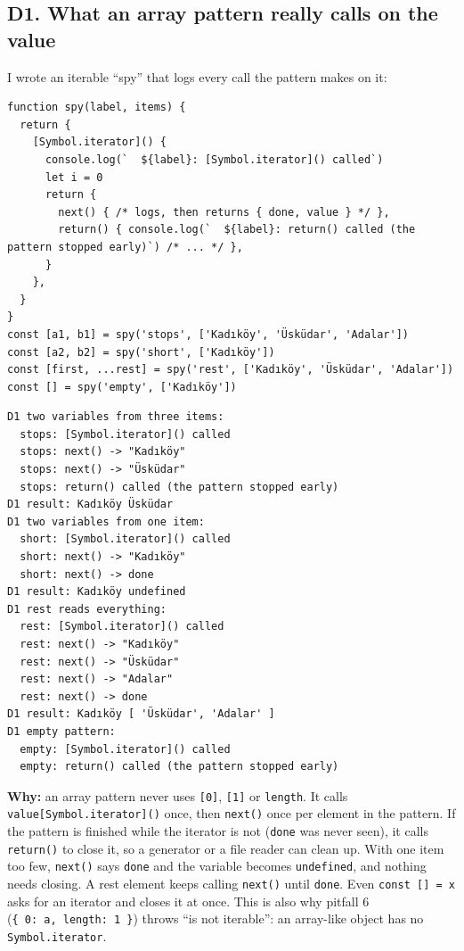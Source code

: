 \documentclass[
  10pt,
]{article}
\begin{document}
\hypertarget{d1-what-an-array-pattern-really-calls-on-the-value}{%
\subsection{D1. What an array pattern really calls on the
value}\label{d1-what-an-array-pattern-really-calls-on-the-value}}

I wrote an iterable ``spy'' that logs every call the pattern makes on
it:

\begin{verbatim}
function spy(label, items) {
  return {
    [Symbol.iterator]() {
      console.log(`  ${label}: [Symbol.iterator]() called`)
      let i = 0
      return {
        next() { /* logs, then returns { done, value } */ },
        return() { console.log(`  ${label}: return() called (the pattern stopped early)`) /* ... */ },
      }
    },
  }
}
const [a1, b1] = spy('stops', ['Kadıköy', 'Üsküdar', 'Adalar'])
const [a2, b2] = spy('short', ['Kadıköy'])
const [first, ...rest] = spy('rest', ['Kadıköy', 'Üsküdar', 'Adalar'])
const [] = spy('empty', ['Kadıköy'])
\end{verbatim}

\begin{verbatim}
D1 two variables from three items:
  stops: [Symbol.iterator]() called
  stops: next() -> "Kadıköy"
  stops: next() -> "Üsküdar"
  stops: return() called (the pattern stopped early)
D1 result: Kadıköy Üsküdar
D1 two variables from one item:
  short: [Symbol.iterator]() called
  short: next() -> "Kadıköy"
  short: next() -> done
D1 result: Kadıköy undefined
D1 rest reads everything:
  rest: [Symbol.iterator]() called
  rest: next() -> "Kadıköy"
  rest: next() -> "Üsküdar"
  rest: next() -> "Adalar"
  rest: next() -> done
D1 result: Kadıköy [ 'Üsküdar', 'Adalar' ]
D1 empty pattern:
  empty: [Symbol.iterator]() called
  empty: return() called (the pattern stopped early)
\end{verbatim}

\textbf{Why:} an array pattern never uses \texttt{{[}0{]\allowbreak{}}},
\texttt{{[}1{]\allowbreak{}}} or \texttt{length}. It calls
\texttt{value{[}Symbol.\allowbreak{}iterator{]\allowbreak{}}()} once,
then \texttt{next()} once per element in the pattern. If the pattern is
finished while the iterator is not (\texttt{done} was never seen), it
calls \texttt{return()} to close it, so a generator or a file reader can
clean up. With one item too few, \texttt{next()} says \texttt{done} and
the variable becomes \texttt{undefined}, and nothing needs closing. A
rest element keeps calling \texttt{next()} until \texttt{done}. Even
\texttt{const\ {[}{]\allowbreak{}}\ =\ x} asks for an iterator and
closes it at once. This is also why pitfall 6
(\texttt{\{\ 0:\ \allowbreak{}\textquotesingle{}a\allowbreak{}\textquotesingle{},\ length:\ 1\ \}})
throws ``is not iterable'': an array-like object has no
\texttt{Symbol.\allowbreak{}iterator}.
\end{document}
